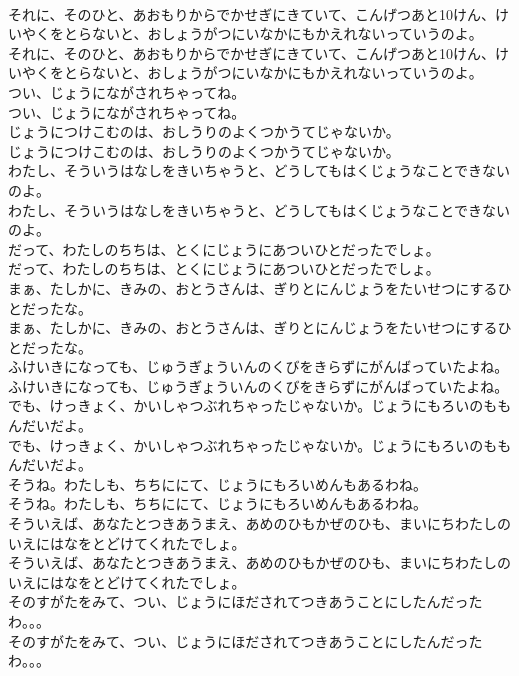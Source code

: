\documentclass[8pt]{extreport}
\begin{document}
\begin{CJK}{UTF8}{min}
\\	それに、そのひと、あおもりからでかせぎにきていて、こんげつあと10けん、けいやくをとらないと、おしょうがつにいなかにもかえれないっていうのよ。
\\	それに、そのひと、あおもりからでかせぎにきていて、こんげつあと10けん、けいやくをとらないと、おしょうがつにいなかにもかえれないっていうのよ。
\\	つい、じょうにながされちゃってね。
\\	つい、じょうにながされちゃってね。
\\	じょうにつけこむのは、おしうりのよくつかうてじゃないか。
\\	じょうにつけこむのは、おしうりのよくつかうてじゃないか。
\\	わたし、そういうはなしをきいちゃうと、どうしてもはくじょうなことできないのよ。
\\	わたし、そういうはなしをきいちゃうと、どうしてもはくじょうなことできないのよ。
\\	だって、わたしのちちは、とくにじょうにあついひとだったでしょ。
\\	だって、わたしのちちは、とくにじょうにあついひとだったでしょ。
\\	まぁ、たしかに、きみの、おとうさんは、ぎりとにんじょうをたいせつにするひとだったな。
\\	まぁ、たしかに、きみの、おとうさんは、ぎりとにんじょうをたいせつにするひとだったな。
\\	ふけいきになっても、じゅうぎょういんのくびをきらずにがんばっていたよね。
\\	ふけいきになっても、じゅうぎょういんのくびをきらずにがんばっていたよね。
\\	でも、けっきょく、かいしゃつぶれちゃったじゃないか。じょうにもろいのももんだいだよ。
\\	でも、けっきょく、かいしゃつぶれちゃったじゃないか。じょうにもろいのももんだいだよ。
\\	そうね。わたしも、ちちににて、じょうにもろいめんもあるわね。
\\	そうね。わたしも、ちちににて、じょうにもろいめんもあるわね。
\\	そういえば、あなたとつきあうまえ、あめのひもかぜのひも、まいにちわたしのいえにはなをとどけてくれたでしょ。
\\	そういえば、あなたとつきあうまえ、あめのひもかぜのひも、まいにちわたしのいえにはなをとどけてくれたでしょ。
\\	そのすがたをみて、つい、じょうにほだされてつきあうことにしたんだったわ。。。
\\	そのすがたをみて、つい、じょうにほだされてつきあうことにしたんだったわ。。。

\end{CJK}
\end{document}
